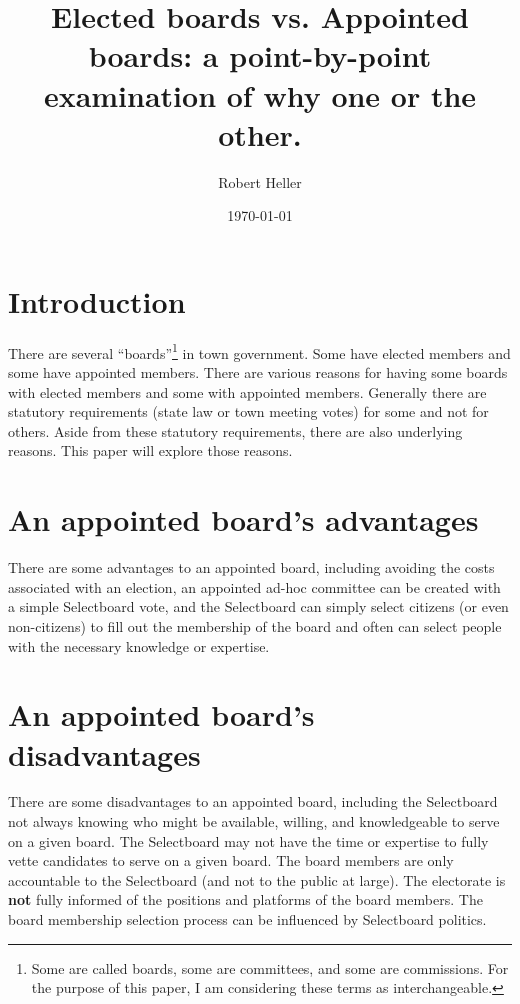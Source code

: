 \documentclass[12pt]{article}
\title{Elected boards vs. Appointed boards: a point-by-point examination of why one or the other.}
\author{Robert Heller}
\date{\today}
\begin{document}
\maketitle

\tableofcontents

\section{Introduction}

There are several ``boards''\footnote{Some are called boards, some are
committees, and some are commissions. For the purpose of this paper, I am
considering these terms as interchangeable.} in town government. Some have
elected members and some have appointed members. There are various reasons for
having some boards with elected members and some with appointed members.
Generally there are statutory requirements (state law or town meeting votes)
for some and not for others. Aside from these statutory requirements, there 
are also underlying reasons.  This paper will explore those reasons.

\section{An appointed board's advantages}

There are some advantages to an appointed board, including avoiding the costs 
associated with an election, an appointed ad-hoc committee can be created with 
a simple Selectboard vote, and the Selectboard can simply select citizens (or 
even non-citizens) to fill out the membership of the board and often can 
select people with the necessary knowledge or expertise.

\section{An appointed board's disadvantages}

There are some disadvantages to an appointed board, including the Selectboard
not always knowing who might be available, willing, and knowledgeable to serve
on a given board. The Selectboard may not have the time or expertise to fully
vette candidates to serve on a given board. The board members are only
accountable to the Selectboard (and not to the public at large). The
electorate is \textbf{not} fully informed of the positions and platforms of
the board members. The board membership selection process can be influenced by
Selectboard politics.
\end{document}
